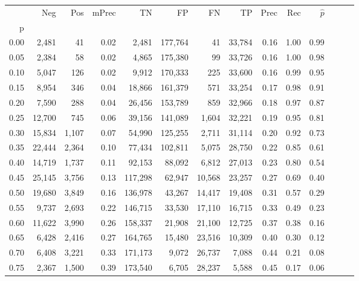 \begin{tabular}{rrrrrrrrrrrrrr}
\toprule
{} &     Neg &    Pos & mPrec &       TN &       FP &      FN &      TP &  Prec &   Rec & $\hat{p}$ \\
p    &         &        &       &          &          &         &         &       &       &           \\
\midrule
0.00 &   2,481 &     41 &  0.02 &    2,481 &  177,764 &      41 &  33,784 &  0.16 &  1.00 &      0.99 \\
0.05 &   2,384 &     58 &  0.02 &    4,865 &  175,380 &      99 &  33,726 &  0.16 &  1.00 &      0.98 \\
0.10 &   5,047 &    126 &  0.02 &    9,912 &  170,333 &     225 &  33,600 &  0.16 &  0.99 &      0.95 \\
0.15 &   8,954 &    346 &  0.04 &   18,866 &  161,379 &     571 &  33,254 &  0.17 &  0.98 &      0.91 \\
0.20 &   7,590 &    288 &  0.04 &   26,456 &  153,789 &     859 &  32,966 &  0.18 &  0.97 &      0.87 \\
0.25 &  12,700 &    745 &  0.06 &   39,156 &  141,089 &   1,604 &  32,221 &  0.19 &  0.95 &      0.81 \\
0.30 &  15,834 &  1,107 &  0.07 &   54,990 &  125,255 &   2,711 &  31,114 &  0.20 &  0.92 &      0.73 \\
0.35 &  22,444 &  2,364 &  0.10 &   77,434 &  102,811 &   5,075 &  28,750 &  0.22 &  0.85 &      0.61 \\
0.40 &  14,719 &  1,737 &  0.11 &   92,153 &   88,092 &   6,812 &  27,013 &  0.23 &  0.80 &      0.54 \\
0.45 &  25,145 &  3,756 &  0.13 &  117,298 &   62,947 &  10,568 &  23,257 &  0.27 &  0.69 &      0.40 \\
0.50 &  19,680 &  3,849 &  0.16 &  136,978 &   43,267 &  14,417 &  19,408 &  0.31 &  0.57 &      0.29 \\
0.55 &   9,737 &  2,693 &  0.22 &  146,715 &   33,530 &  17,110 &  16,715 &  0.33 &  0.49 &      0.23 \\
0.60 &  11,622 &  3,990 &  0.26 &  158,337 &   21,908 &  21,100 &  12,725 &  0.37 &  0.38 &      0.16 \\
0.65 &   6,428 &  2,416 &  0.27 &  164,765 &   15,480 &  23,516 &  10,309 &  0.40 &  0.30 &      0.12 \\
0.70 &   6,408 &  3,221 &  0.33 &  171,173 &    9,072 &  26,737 &   7,088 &  0.44 &  0.21 &      0.08 \\
0.75 &   2,367 &  1,500 &  0.39 &  173,540 &    6,705 &  28,237 &   5,588 &  0.45 &  0.17 &      0.06 \\

\end{tabular}

